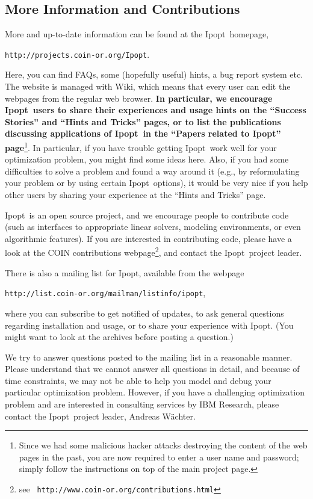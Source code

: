 \documentclass[10pt]{article}
\newcommand{\Ipopt}{{\sc Ipopt}}
\begin{document}
\subsection{More Information and Contributions}
More and up-to-date information can be found at the \Ipopt\ homepage,

\begin{center}
\texttt{http://projects.coin-or.org/Ipopt}.
\end{center}

Here, you can find FAQs, some (hopefully useful) hints, a bug report
system etc.  The website is managed with Wiki, which means that every
user can edit the webpages from the regular web browser.  {\bf In
  particular, we encourage \Ipopt\ users to share their experiences
  and usage hints on the ``Success Stories'' and ``Hints and Tricks''
  pages, or to list the publications discussing applications of
  \Ipopt\ in the ``Papers related to Ipopt'' page}\footnote{Since we
  had some malicious hacker attacks destroying the content of the web
  pages in the past, you are now required to enter a user name and
  password; simply follow the instructions on top of the main project
  page.}.  In particular, if you have trouble getting \Ipopt\ work
well for your optimization problem, you might find some ideas here.
Also, if you had some difficulties to solve a problem and found a way
around it (e.g., by reformulating your problem or by using certain
\Ipopt\ options), it would be very nice if you help other users by
sharing your experience at the ``Hints and Tricks'' page.

\Ipopt\ is an open source project, and we encourage people to
contribute code (such as interfaces to appropriate linear solvers,
modeling environments, or even algorithmic features).  If you are
interested in contributing code, please have a look at the COIN
contributions webpage\footnote{see \tt
  http://www.coin-or.org/contributions.html}, and contact the \Ipopt\
project leader.

There is also a mailing list for \Ipopt, available from the webpage
\begin{center}
\texttt{http://list.coin-or.org/mailman/listinfo/ipopt},
\end{center}
where you can subscribe to get notified of updates, to ask general
questions regarding installation and usage, or to share your
experience with \Ipopt. (You might want to look at the archives before
posting a question.)

We try to answer questions posted to the mailing list in a reasonable
manner.  Please understand that we cannot answer all questions in
detail, and because of time constraints, we may not be able to help
you model and debug your particular optimization problem.  However, if
you have a challenging optimization problem and are interested in
consulting services by IBM Research, please contact the \Ipopt\
project leader, Andreas W\"achter.
\end{document}
